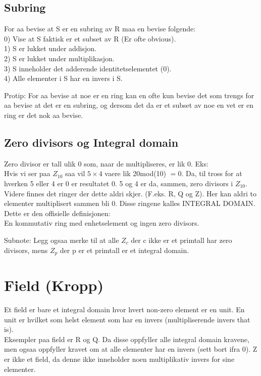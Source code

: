 \documentclass[12pt,a4paper]{article}
\begin{document}
\subsection*{Subring}
For aa bevise at S er en subring av R maa en bevise folgende:\\
0) Vise at S faktisk er et subset av R (Er ofte obvious).\\
1) S er lukket under addisjon.\\
2) S er lukket under multiplikasjon.\\
3) S inneholder det adderende identitetselementet (0).\\
4) Alle elementer i S har en invers i S.

Protip: For aa bevise at noe er en ring kan en ofte kun bevise det som trengs for aa bevise at det er en subring, og dersom det da er et subset av noe en vet er en ring er det nok aa bevise.

\subsection*{Zero divisors og Integral domain}
Zero divisor er tall ulik 0 som, naar de multipliseres, er lik 0. Eks:\\
Hvis vi ser paa $Z_{10}$ saa vil $5 \times 4$ vaere lik 20mod(10) $= 0$. Da, til tross for at hverken 5 eller 4 er 0 er resultatet 0. 5 og 4 er da, sammen, zero divisors i $Z_{10}$. \\

Videre finnes det ringer der dette aldri skjer. (F.eks. R, Q og Z). Her kan aldri to elementer multiplisert sammen bli 0. Disse ringene kalles INTEGRAL DOMAIN. Dette er den offisielle definisjonen:\\
En kommutativ ring med enhetselement og ingen zero divisors.

Subnote: Legg ogsaa merke til at alle $Z_c$ der c ikke er et primtall har zero divisors, mens $Z_p$ der p er et primtall er et integral domain. 

\section*{Field (Kropp)}
Et field er bare et integral domain hvor hvert non-zero element er en unit. En unit er hvilket som helst element som har en invers (multipliserende invers that is). \\
Eksempler paa field er R og Q. Da disse oppfyller alle integral domain kravene, men ogsaa oppfyller kravet om at alle elementer har en invers (sett bort ifra 0). Z er ikke et field, da denne ikke inneholder noen multiplikativ invers for sine elementer. \\
\end{document}
